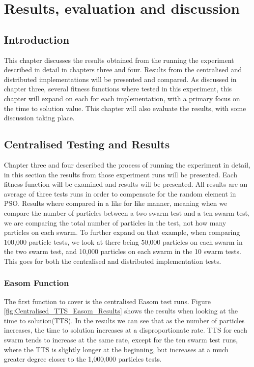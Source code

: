 \documentclass[oneside,12pt]{book}
\begin{document}
\chapter{Results, evaluation and discussion}
\section{Introduction}
This chapter discusses the results obtained from the running the experiment described in detail in chapters three and four. Results from the centralised and distributed implementations will be presented and compared. As discussed in chapter three, several fitness functions where tested in this experiment, this chapter will expand on each for each implementation, with a primary focus on the time to solution value. This chapter will also evaluate the results, with some discussion taking place. 

\section{Centralised Testing and Results}
Chapter three and four described the process of running the experiment in detail, in this section the results from those experiment runs will be presented. Each fitness function will be examined and results will be presented. All results are an average of three tests runs in order to compensate for the random element in PSO. Results where compared in a like for like manner, meaning when we compare the number of particles between a two swarm test and a ten swarm test, we are comparing the total number of particles in the test, not how many particles on each swarm. To further expand on that example, when comparing 100,000 particle tests, we look at there being 50,000 particles on each swarm in the two swarm test, and 10,000 particles on each swarm in the 10 swarm tests. This goes for both the centralised and distributed implementation tests. 

\subsection{Easom Function}
The first function to cover is the centralised Easom test runs. Figure \ref{fig:Centralised_TTS_Easom_Results} shows the results when looking at the time to solution(TTS). In the results we can see that as the number of particles increases, the time to solution increases at a disproportionate rate. TTS for each swarm tends to increase at the same rate, except for the ten swarm test runs, where the TTS is slightly longer at the beginning, but increases at a much greater degree closer to the 1,000,000 particles tests.
\end{document}
